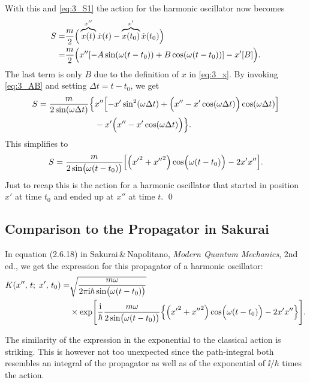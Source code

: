 \documentclass[11pt,letter, swedish, english
]{article}
\begin{document}
With this and \eqref{eq:3_S1} the action for the harmonic oscillator
now becomes
\begin{equation}
\begin{aligned}
S=&\frac{m}{2}\Big(\overbrace{x(t)}^{x''}\dot{x}(t)
-\overbrace{x(t_0)}^{x'}\dot{x}(t_0)\Big)\\
=&\frac{m}{2}\Big(x''\qty[-A\sin(\omega(t-t_0))+B\cos(\omega(t-t_0))]
-x'\qty[B]\Big).
\end{aligned}
\end{equation}
The last term is only $B$ due to the definition of $x$ in
\eqref{eq:3_x}. By invoking \eqref{eq:3_AB} and setting
$\Delta{t}=t-t_0$, we get 
\begin{equation}
\begin{aligned}
S=\frac{m}{2\sin(\omega\Delta{t})}
\Big\{ &x''\qty[-x'\sin^2(\omega\Delta{t})
+\Big(x''-x'\cos(\omega\Delta{t})\Big)\cos(\omega\Delta{t})]
\\ &
-x'\Big(x''-x'\cos(\omega\Delta{t})\Big)\Big\}.
\end{aligned}
\end{equation}
This simplifies to
\begin{equation}
S=\frac{m}{2\sin(\omega(t-t_0)\big.)}
\qty[\qty({x'}^2+{x''}^2)\cos(\omega(t-t_0)\Big.)-2x'x''].
\end{equation}
Just to recap this is the action for a harmonic oscillator that
started in position $x'$ at time $t_0$ and ended up at $x''$ at time
$t$. 
\qed

\subsection{Comparison to the Propagator in Sakurai}
In equation (2.6.18) in Sakurai\,\&\,Napolitano, \textit{Modern
  Quantum Mechanics}, 2nd ed., we get the expression for this
propagator of a harmonic oscillator:
\begin{equation}
\begin{aligned}
K(x'',\, t;\; x',\,t_0)=&
\sqrt{\frac{m\omega}{2\pi\mathrm{i}\hbar\sin(\omega(t-t_0)\big.)}}\\
&\times \exp[\frac{\mathrm{i}}{\hbar}\frac{m\omega}{2\sin(\omega(t-t_0)\big.)}
\qty{\qty({x'}^2+{x''}^2)\cos(\omega(t-t_0)\Big.)-2x'x''}].
\end{aligned}
\end{equation}

The similarity of the expression in the exponential to the classical
action is striking. This is however not too unexpected since the
path-integral both resembles an integral of the propagator as well as
of the exponential of $\ii/\hbar$ times the action. 
\end{document}
